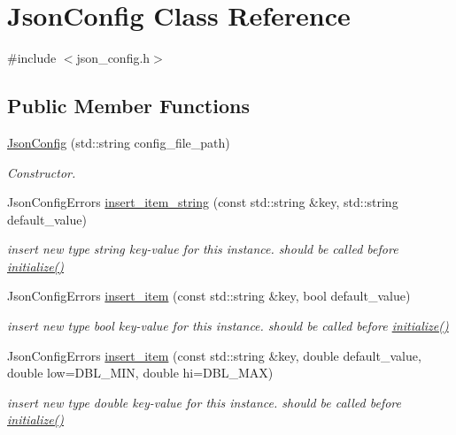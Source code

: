 \hypertarget{classJsonConfig}{\section{Json\-Config Class Reference}
\label{classJsonConfig}
}


{\ttfamily \#include $<$json\-\_\-config.\-h$>$}

\subsection*{Public Member Functions}
\begin{DoxyCompactItemize}
\item 
\hyperlink{classJsonConfig_a0b53a968f4d0eaff96fd22250f16ff8a}{Json\-Config} (std\-::string config\-\_\-file\-\_\-path)
\begin{DoxyCompactList}\small\item\em Constructor. \end{DoxyCompactList}\item 
Json\-Config\-Errors \hyperlink{classJsonConfig_a069283404d27fb0adc4097b42948d739}{insert\-\_\-item\-\_\-string} (const std\-::string \&key, std\-::string default\-\_\-value)
\begin{DoxyCompactList}\small\item\em insert new type string key-\/value for this instance. should be called before \hyperlink{classJsonConfig_ac25bb66c90b5c2ae6853376b288620c9}{initialize()} \end{DoxyCompactList}\item 
Json\-Config\-Errors \hyperlink{classJsonConfig_acf439fc33e6311c68de35cfa4d481428}{insert\-\_\-item} (const std\-::string \&key, bool default\-\_\-value)
\begin{DoxyCompactList}\small\item\em insert new type bool key-\/value for this instance. should be called before \hyperlink{classJsonConfig_ac25bb66c90b5c2ae6853376b288620c9}{initialize()} \end{DoxyCompactList}\item 
Json\-Config\-Errors \hyperlink{classJsonConfig_a929c902ca7517a27aa3c1707da954fae}{insert\-\_\-item} (const std\-::string \&key, double default\-\_\-value, double low=D\-B\-L\-\_\-\-M\-I\-N, double hi=D\-B\-L\-\_\-\-M\-A\-X)
\begin{DoxyCompactList}\small\item\em insert new type double key-\/value for this instance. should be called before \hyperlink{classJsonConfig_ac25bb66c90b5c2ae6853376b288620c9}{initialize()} \end{DoxyCompactList}\item 

\end{DoxyCompactItemize}
